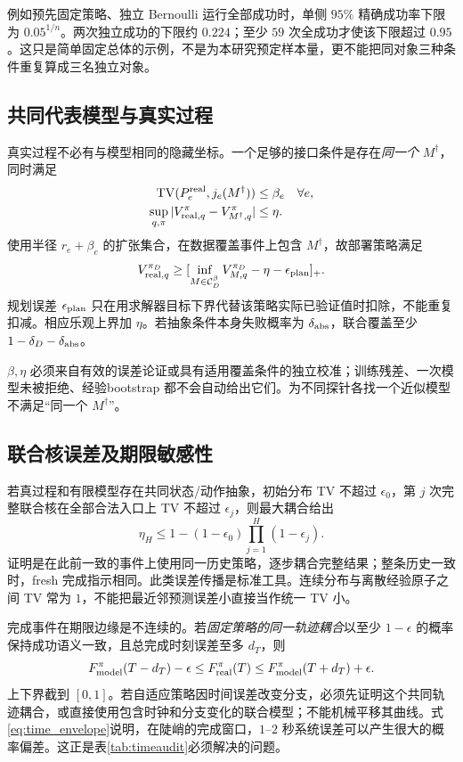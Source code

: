 \documentclass[11pt,a4paper,fontset=fandol]{ctexart}
\theoremstyle{definition}
\theoremstyle{remark}\newtheorem{remark}[theorem]{说明}
\numberwithin{equation}{section}
\newcommand{\TV}{\operatorname{TV}}\newcommand{\supp}{\operatorname{supp}}
\newcommand{\pos}[1]{[#1]_+}
\begin{document}
例如预先固定策略、独立 Bernoulli 运行全部成功时，单侧 $95\%$ 精确成功率下限为 $0.05^{1/n}$。两次独立成功的下限约 $0.224$；至少 $59$ 次全成功才使该下限超过 $0.95$。这只是简单固定总体的示例，不是为本研究预定样本量，更不能把同对象三种条件重复算成三名独立对象。

\subsection{共同代表模型与真实过程}
真实过程不必有与模型相同的隐藏坐标。一个足够的接口条件是存在\emph{同一个} $M^\dagger$，同时满足
\begin{align}
 \TV(P^{\rm real}_e,j_e(M^\dagger))&\le\beta_e\quad\forall e,\label{eq:beta}\\
 \sup_{q,\pi}|V_{{\rm real},q}^{\pi}-V_{M^\dagger,q}^{\pi}|&\le\eta.
 \label{eq:eta}
\end{align}
使用半径 $r_e+\beta_e$ 的扩张集合，在数据覆盖事件上包含 $M^\dagger$，故部署策略满足
\begin{equation}
 V_{{\rm real},q}^{\pi_D}\ge
 \pos{\inf_{M\in\cC_D^\beta}V_{M,q}^{\pi_D}-\eta-\epsilon_{\rm plan}}.
 \label{eq:real_lower}
\end{equation}
规划误差 $\epsilon_{\rm plan}$ 只在用求解器目标下界代替该策略实际已验证值时扣除，不能重复扣减。相应乐观上界加 $\eta$。若抽象条件本身失败概率为 $\delta_{\rm abs}$，联合覆盖至少 $1-\delta_D-\delta_{\rm abs}$。

$\beta,\eta$ 必须来自有效的误差论证或具有适用覆盖条件的独立校准；训练残差、一次模型未被拒绝、经验bootstrap 都不会自动给出它们。为不同探针各找一个近似模型不满足“同一个 $M^\dagger$”。

\subsection{联合核误差及期限敏感性}
若真过程和有限模型存在共同状态/动作抽象，初始分布 TV 不超过 $\epsilon_0$，第 $j$ 次完整联合核在全部合法入口上 TV 不超过 $\epsilon_j$，则最大耦合给出
\begin{equation}
 \eta_H\le1-(1-\epsilon_0)\prod_{j=1}^{H}(1-\epsilon_j).
 \label{eq:coupling}
\end{equation}
证明是在此前一致的事件上使用同一历史策略，逐步耦合完整结果；整条历史一致时，fresh 完成指示相同。此类误差传播是标准工具\cite{ais}。连续分布与离散经验原子之间 TV 常为 $1$，不能把最近邻预测误差小直接当作统一 TV 小。

完成事件在期限边缘是不连续的。若\emph{固定策略的同一轨迹耦合}以至少 $1-\epsilon$ 的概率保持成功语义一致，且总完成时刻误差至多 $d_T$，则
\begin{equation}
 F_{\rm model}^{\pi}(T-d_T)-\epsilon
 \le F_{\rm real}^{\pi}(T)
 \le F_{\rm model}^{\pi}(T+d_T)+\epsilon.
 \label{eq:time_envelope}
\end{equation}
上下界截到 $[0,1]$。若自适应策略因时间误差改变分支，必须先证明这个共同轨迹耦合，或直接使用包含时钟和分支变化的联合模型；不能机械平移其曲线。式\eqref{eq:time_envelope}说明，在陡峭的完成窗口，$1$--$2$ 秒系统误差可以产生很大的概率偏差。这正是表\ref{tab:timeaudit}必须解决的问题。
\end{document}
